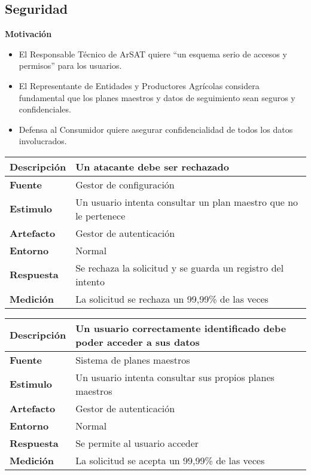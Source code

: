 \subsection{Seguridad}
\textbf{Motivación}
\begin{itemize}
 \item El Responsable T\'ecnico de ArSAT quiere ``un esquema serio de accesos y permisos'' para los usuarios.
 \item El Representante de Entidades y Productores Agr\'icolas considera fundamental que los planes maestros y datos de seguimiento sean seguros y confidenciales.
 \item Defensa al Consumidor quiere asegurar confidencialidad de todos los datos involucrados.
\end{itemize}

\begin{tabular}{| l || p{12cm} |}
\hline 
\textbf{Descripci\'on} & Un atacante debe ser rechazado \\
\hline 
\textbf{Fuente} & Gestor de configuración \\
\hline 
\textbf{Estimulo} & Un usuario intenta consultar un plan maestro que no le pertenece \\
\hline 
\textbf{Artefacto} & Gestor de autenticación \\
\hline 
\textbf{Entorno} & Normal \\
\hline 
\textbf{Respuesta} & Se rechaza la solicitud y se guarda un registro del intento \\
\hline 
\textbf{Medici\'on} & La solicitud se rechaza un 99,99\% de las veces \\
\hline 
\end{tabular}

\medskip

\begin{tabular}{| l || p{12cm} |}
\hline 
\textbf{Descripci\'on} & Un usuario correctamente identificado debe poder acceder a sus datos \\
\hline 
\textbf{Fuente} & Sistema de planes maestros \\
\hline 
\textbf{Estimulo} & Un usuario intenta consultar sus propios planes maestros \\
\hline 
\textbf{Artefacto} & Gestor de autenticación \\
\hline 
\textbf{Entorno} & Normal \\
\hline 
\textbf{Respuesta} & Se permite al usuario acceder \\
\hline 
\textbf{Medici\'on} & La solicitud se acepta un 99,99\% de las veces \\
\hline 
\end{tabular}

